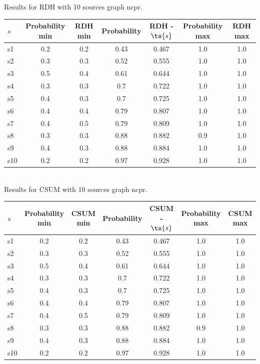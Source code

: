 \documentclass{article}
\begin{document}
\noindent Results for RDH with 10 sources graph ncpr.

\noindent\begin{tabular}{|l|c|c|c|c|c|c|}
\hline
$s$& Probability min & RDH min & Probability & RDH - $\ts{s}$ & Probability max & RDH max\\
\hline
s1 &0.2 & 0.2 & 0.43 & 0.467 & 1.0 & 1.0\\
\hline
s2 &0.3 & 0.3 & 0.52 & 0.555 & 1.0 & 1.0\\
\hline
s3 &0.5 & 0.4 & 0.61 & 0.644 & 1.0 & 1.0\\
\hline
s4 &0.3 & 0.3 & 0.7 & 0.722 & 1.0 & 1.0\\
\hline
s5 &0.4 & 0.3 & 0.7 & 0.725 & 1.0 & 1.0\\
\hline
s6 &0.4 & 0.4 & 0.79 & 0.807 & 1.0 & 1.0\\
\hline
s7 &0.4 & 0.5 & 0.79 & 0.809 & 1.0 & 1.0\\
\hline
s8 &0.3 & 0.3 & 0.88 & 0.882 & 0.9 & 1.0\\
\hline
s9 &0.4 & 0.3 & 0.88 & 0.884 & 1.0 & 1.0\\
\hline
s10 &0.2 & 0.2 & 0.97 & 0.928 & 1.0 & 1.0\\
\hline
\end{tabular}\\

\noindent Results for CSUM with 10 sources graph ncpr.

\noindent\begin{tabular}{|l|c|c|c|c|c|c|}
\hline
$s$& Probability min & CSUM min & Probability & CSUM - $\ts{s}$ & Probability max & CSUM max\\
\hline
s1 &0.2 & 0.2 & 0.43 & 0.467 & 1.0 & 1.0\\
\hline
s2 &0.3 & 0.3 & 0.52 & 0.555 & 1.0 & 1.0\\
\hline
s3 &0.5 & 0.4 & 0.61 & 0.644 & 1.0 & 1.0\\
\hline
s4 &0.3 & 0.3 & 0.7 & 0.722 & 1.0 & 1.0\\
\hline
s5 &0.4 & 0.3 & 0.7 & 0.725 & 1.0 & 1.0\\
\hline
s6 &0.4 & 0.4 & 0.79 & 0.807 & 1.0 & 1.0\\
\hline
s7 &0.4 & 0.5 & 0.79 & 0.809 & 1.0 & 1.0\\
\hline
s8 &0.3 & 0.3 & 0.88 & 0.882 & 0.9 & 1.0\\
\hline
s9 &0.4 & 0.3 & 0.88 & 0.884 & 1.0 & 1.0\\
\hline
s10 &0.2 & 0.2 & 0.97 & 0.928 & 1.0 & 1.0\\
\hline
\end{tabular}\\
\end{document}
